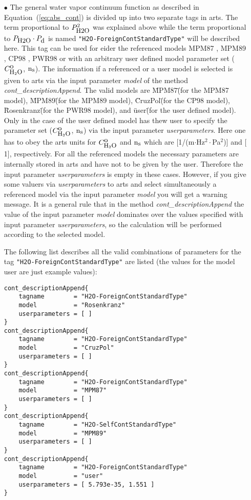 \begin{itemize}
\item[$\bullet$] The general water vapor continuum function
as described in Equation~(\ref{eq:abs_cont}) is divided up into 
two separate tags in arts. The term proportional 
to $P_{\mbox{\rm \small H2O}}^2$ was explained above while the term proportional 
to $P_{\mbox{\rm \small H2O}} \cdot P_{\mbox{\rm \small d}}$ is named {\tt "H2O-ForeignContStandardType"}
will be described here.
This tag can be used for eider the referenced models 
MPM87 \citep{liebeandlayton:87}, MPM89 \citep{liebe:89}, 
CP98 \citep{cruzpol:98}, PWR98 \citep{pwr:98} or with
an arbitrary user defined model parameter set ($C^{\mbox{\rm o}}_{\mbox{\rm \small H}_{2}\mbox{\rm \small O}}$, ${\rm n}_{\mbox{\rm \small s}}$).
The information if a referenced or a user model is selected 
is given to arts via the input parameter {\it model} of the 
method {\it cont\_descriptionAppend}. The valid models are
\"MPM87\" (for the MPM87 model), \"MPM89\" (for the MPM89 model), 
\"CruzPol\" (for the CP98 model), \"Rosenkranz\" (for the PWR98 model), 
and \"user\"  (for the user defined model). Only in the case 
of the user defined model has thew user to specify the 
parameter set ($C^{\mbox{\rm o}}_{\mbox{\rm \small H}_{2}\mbox{\rm \small O}}$, ${\rm n}_{\mbox{\rm \small s}}$) via the input parameter 
{\it userparameters}. Here one has to obey the arts units for 
$C^{\mbox{\rm o}}_{\mbox{\rm \small H}_{2}\mbox{\rm \small O}}$ and ${\rm n}_{\mbox{\rm \small s}}$ which are $[$1/(m$\cdot$Hz$^2\cdot$Pa$^2$)$]$ and 
$[$1$]$, respectively. For all the referenced models the necessary
parameters are internally stored in arts and have not to be given by
the user. Therefore the input parameter {\it userparameters} is empty
in these cases. However, if you give some valuers via 
{\it userparameters} to arts and select simultaneously a 
referenced model via the input parameter {\it model} you will get 
a warning message. It is a general rule that in the method 
{\it cont\_descriptionAppend} the value of the input 
parameter {\it model} dominates over the values specified with 
input parameter {\it userparameters}, so the calculation will be
performed according to the selected model.

The following list describes all the valid combinations of parameters for the
tag {\tt "H2O-ForeignContStandardType"} are listed (the values for the 
model user are just example values): 
\begin{verbatim}
cont_descriptionAppend{
    tagname        = "H2O-ForeignContStandardType"
    model          = "Rosenkranz"
    userparameters = [ ]
}
cont_descriptionAppend{
    tagname        = "H2O-ForeignContStandardType"
    model          = "CruzPol"
    userparameters = [ ]
}
cont_descriptionAppend{
    tagname        = "H2O-ForeignContStandardType"
    model          = "MPM87"
    userparameters = [ ]
}
cont_descriptionAppend{
    tagname        = "H2O-SelfContStandardType"
    model          = "MPM89"
    userparameters = [ ]
}
cont_descriptionAppend{
    tagname        = "H2O-ForeignContStandardType"
    model          = "user"
    userparameters = [ 5.793e-35, 1.551 ]
}
\end{verbatim}



\end{itemize}
